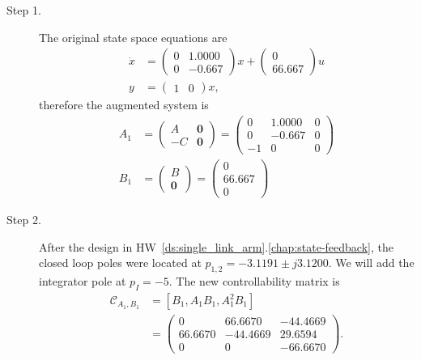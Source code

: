 \begin{description}
\item[Step 1.]
The original state space equations are 
\begin{align*}
\dot{x} &= \begin{pmatrix} 0 &   1.0000 \\ 0 &  -0.667 \end{pmatrix}x + \begin{pmatrix} 0 \\ 66.667 \end{pmatrix} u \\
y &= \begin{pmatrix}1 & 0 \end{pmatrix}x,
\end{align*}
therefore the augmented system is
\begin{align*}
A_1 &= \begin{pmatrix} A & \mathbf{0} \\ -C & \mathbf{0} \end{pmatrix} = \begin{pmatrix} 0 &   1.0000 & 0 \\ 0 &  -0.667 & 0 \\ -1 & 0 & 0 \end{pmatrix} \\
B_1 &= \begin{pmatrix} B \\ \mathbf{0} \end{pmatrix} = \begin{pmatrix} 0 \\ 66.667 \\ 0 \end{pmatrix}
\end{align*}

\item[Step 2.] 
After the design in HW~\ref{ds:single_link_arm}.\ref{chap:state-feedback}, the closed loop poles were located at $p_{1,2} = -3.1191 \pm j 3.1200$.  We will add the integrator pole at $p_I=-5$.
The new controllability matrix is 
\begin{align*}
\mathcal{C}_{A_1,B_1} &= [B_1, A_1B_1, A_1^2B_1] \\ &= \begin{pmatrix} 
         0 &   66.6670 & -44.4669 \\
   66.6670 & -44.4669  & 29.6594 \\
         0 &        0  & -66.6670
\end{pmatrix}.
\end{align*}


\end{description}

